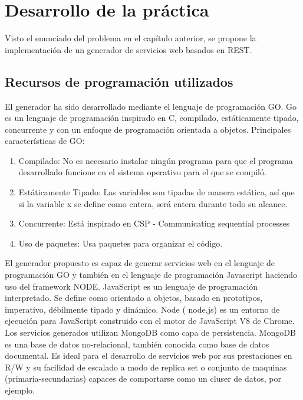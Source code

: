 \documentclass[a4paper,11pt]{book}
\begin{document}
\chapter{Desarrollo de la práctica }

Visto el enunciado del problema en el capítulo anterior, se propone la implementación de un generador de servicios web basados en REST. 

\section{Recursos de programación utilizados}

El generador ha sido desarrollado mediante el lenguaje de programación GO\cite{go}.  Go es un lenguaje de programación inspirado en C, compilado, estáticamente tipado, concurrente y con un enfoque de programación orientada a objetos.  Principales características de GO:

\begin{enumerate}
\item Compilado: No es necesario instalar ningún programa para que el programa desarrollado funcione en el sistema operativo para el que se compiló. 
\item Estáticamente Tipado: Las variables son tipadas de manera estática, así que si la variable x se define como entera, será entera durante todo su alcance.
\item Concurrente: Está inspirado en CSP - Communicating sequential processes\cite{csp}
\item Uso de paquetes: Usa paquetes para organizar el código.
\end{enumerate}

El generador propuesto es capaz de generar servicios web en el lenguaje de programación GO y también en el lenguaje de programación Javascript\cite{js} haciendo uso del framework NODE. JavaScript es un lenguaje de programación interpretado. Se define como orientado a objetos, basado en prototipos, imperativo, débilmente tipado y dinámico. Node\cite{node} ( node.js)  es un entorno de ejecución para JavaScript construido con el motor de JavaScript V8 de Chrome. Los servicios generados utilizan MongoDB\cite{mongo} como capa de persistencia. MongoDB es una base de datos no-relacional, también conocida como base de datos documental. Es ideal para el desarrollo de servicios web por sus prestaciones en R/W y su facilidad de escalado a modo de replica set o conjunto de maquinas (primaria-secundarias) capaces de comportarse como un cluser de datos,  por ejemplo. 
\end{document}

